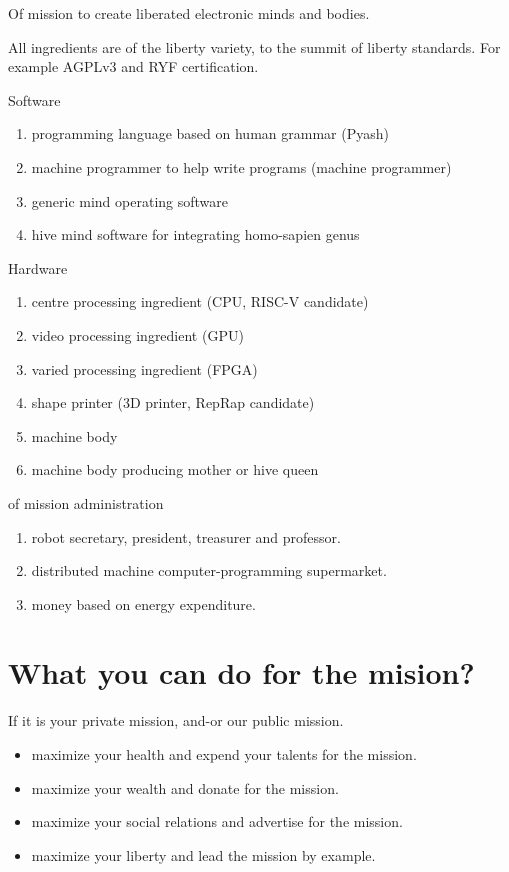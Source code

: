 \documentclass{report}
\begin{document}
Of mission to create liberated electronic minds and bodies.

All ingredients are of the liberty variety, to the summit of liberty standards.
For example AGPLv3 and RYF certification.

Software
\begin{enumerate}
  \item programming language based on human grammar (Pyash)
  \item machine programmer to help write programs (machine programmer)
  \item generic mind operating software
  \item hive mind software for integrating homo-sapien genus
\end{enumerate}

Hardware
\begin{enumerate}
  \item centre processing ingredient (CPU, RISC-V candidate)
  \item video processing ingredient (GPU)
  \item varied processing ingredient (FPGA)
  \item shape printer (3D printer, RepRap candidate)
  \item machine body
  \item machine body producing mother or hive queen
\end{enumerate}

of mission administration
\begin{enumerate}
  \item robot secretary, president, treasurer and professor.
  \item distributed machine computer-programming supermarket. 
  \item money based on energy expenditure.
\end{enumerate}

\section{What you can do for the mision?}

If it is your private mission, and-or our public mission.

\begin{itemize}
  \item maximize your health and expend your talents for the mission.
  \item maximize your wealth and donate for the mission.
  \item maximize your social relations and advertise for  the mission.
  \item maximize your liberty and lead the mission by example.
\end{itemize}
\end{document}
